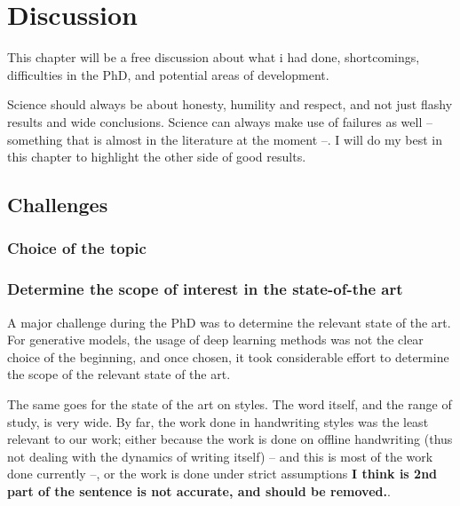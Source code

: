 \chapter{Discussion}

This chapter will be a free discussion about what i had done, shortcomings, difficulties in the PhD, and potential areas of development.

Science should always be about honesty, humility and respect, and not just flashy results and wide conclusions. Science can always make use of failures as well -- something that is almost in the literature at the moment --. I will do my best in this chapter to highlight the other side of good results.

\clearpage

\section{Challenges}
\subsection{Choice of the topic}

\subsection{Determine the scope of interest in the state-of-the art}

\par A major challenge during the PhD was to determine the relevant state of the art. For generative models, the usage of deep learning methods was not the clear choice of the beginning, and once chosen, it took considerable effort to determine the scope of the relevant state of the art.

\par The same goes for the state of the art on styles. The word itself, and the range of study, is very wide. By far, the work done in handwriting styles was the least relevant to our work; either because the work is done on offline handwriting (thus not dealing with the dynamics of writing itself) -- and this is most of the work done currently --, or the work is done under strict assumptions \textbf{I think is 2nd part of the sentence is not accurate, and should be removed.}.

